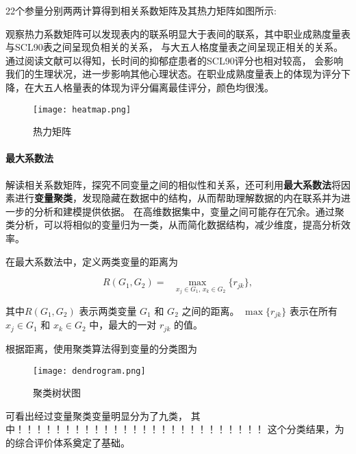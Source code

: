 \documentclass[withoutpreface,bwprint]{cumcmthesis} %
\begin{document}
22个参量分别两两计算得到相关系数矩阵及其热力矩阵如图所示:

观察热力系数矩阵可以发现表内的联系明显大于表间的联系，其中职业成熟度量表与SCL90表之间呈现负相关的关系，
与大五人格度量表之间呈现正相关的关系。通过阅读文献\cite{Chi-Square Test}可以得知，长时间的抑郁症患者的SCL90评分也相对较高，
会影响我们的生理状况，进一步影响其他心理状态。在职业成熟度量表上的体现为评分下降，在大五人格量表的体现为评分偏离最佳评分，颜色均很浅。


\begin{figure}
    \centering
    \begin{minipage}[c]{0.8\textwidth}
        \centering
        \texttt{[image: heatmap.png]}
    \end{minipage}
    \caption{热力矩阵}
\end{figure}
\paragraph*{最大系数法}解读相关系数矩阵，探究不同变量之间的相似性和关系，还可利用\textbf{最大系数法}将因素进行\textbf{变量聚类}，发现隐藏在数据中的结构，从而帮助理解数据的内在联系并为进一步的分析和建模提供依据。
在高维数据集中，变量之间可能存在冗余。通过聚类分析，可以将相似的变量归为一类，从而简化数据结构，减少维度，提高分析效率。

在最大系数法中，定义两类变量的距离为

\begin{equation}
    R(G_1, G_2) = \max_{\quad x_j \in G_1, \, x_k \in G_2} \{ r_{jk} \}, 
\end{equation}

其中\( R(G_1, G_2) \) 表示两类变量 \( G_1 \) 和 \( G_2 \) 之间的距离。
\( \max \{ r_{jk} \} \) 表示在所有 \( x_j \in G_1 \) 和 \( x_k \in G_2 \) 中，最大的一对 \( r_{jk} \) 的值。

根据距离，使用聚类算法得到变量的分类图为

\begin{figure}
    \centering
    \begin{minipage}[c]{0.8\textwidth}
        \centering
        \texttt{[image: dendrogram.png]}
    \end{minipage}
    \caption{聚类树状图}
\end{figure}

可看出经过变量聚类变量明显分为了九类，
其中！！！！！！！！！！！！！！！！！！！！！！！！！！
这个分类结果，为的综合评价体系奠定了基础。
\end{document}
